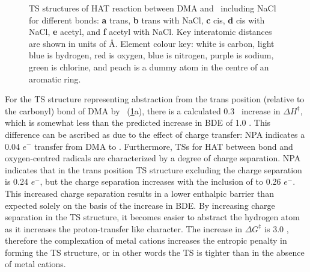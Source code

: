 \begin{figure}[!htbp]\ContinuedFloat

  \caption[TS structures of HAT reaction between DMA and \cumo\ including and excluding NaCl.]{TS structures of HAT reaction between DMA and \cumo\ including NaCl for different  bonds: \textbf{a} trans, \textbf{b} trans with NaCl, \textbf{c} cis, \textbf{d} cis with NaCl, \textbf{e} acetyl, and \textbf{f} acetyl with NaCl. Key interatomic distances are shown in units of \AA. Element colour key: white is carbon, light blue is hydrogen, red is oxygen, blue is nitrogen, purple is sodium, green is chlorine, and peach is a dummy atom in the centre of an aromatic ring.}
  \label{fig:dma-cumo-ts}
\end{figure}

For the TS structure representing abstraction from the trans position (relative to the carbonyl)  bond of DMA by \cumo\ (\ref{fig:dma-cumo-ts}a), there is a calculated 0.3 \kcalmol\ increase in $\Delta H^\ddagger$, which is somewhat less than the predicted increase in BDE of 1.0 \kcalmol. This difference can be ascribed as due to the effect of charge transfer: NPA indicates a 0.04 $e^-$ transfer from DMA to . Furthermore, TSs for HAT between  bond and oxygen-centred radicals are characterized by a degree of charge separation.\cite{Roberts1999} NPA indicates that in the trans position TS structure excluding  the charge separation is 0.24 $e^-$, but the charge separation increases with the inclusion of  to 0.26 $e^-$. This increased charge separation results in a lower enthalpic barrier than expected solely on the basis of the increase in  BDE. By increasing charge separation in the TS structure, it becomes easier to abstract the hydrogen atom as it increases the proton-transfer like character. The increase in $\Delta G^\ddagger$ is 3.0 \kcalmol, therefore the complexation of metal cations increases the entropic penalty in forming the TS structure, or in other words the TS is tighter than in the absence of metal cations.


